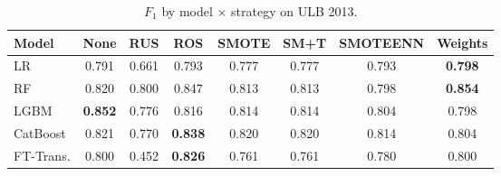 \begin{table}[ht!]
\centering
\caption{$F_1$ by model $\times$ strategy on ULB 2013.}
\label{tab:factorial_ulb_f1}
\begin{tabular}{l c c c c c c c}
\toprule
Model & None & RUS & ROS & SMOTE & SM+T & SMOTEENN & Weights \\
\midrule
LR         & 0.791 & 0.661 & 0.793 & 0.777 & 0.777 & 0.793 & \textbf{0.798} \\
RF         & 0.820 & 0.800 & 0.847 & 0.813 & 0.813 & 0.798 & \textbf{0.854} \\
LGBM       & \textbf{0.852} & 0.776 & 0.816 & 0.814 & 0.814 & 0.804 & 0.798 \\
CatBoost   & 0.821 & 0.770 & \textbf{0.838} & 0.820 & 0.820 & 0.814 & 0.804 \\
FT-Trans.  & 0.800 & 0.452 & \textbf{0.826} & 0.761 & 0.761 & 0.780 & 0.800 \\
\bottomrule
\end{tabular}
\end{table}